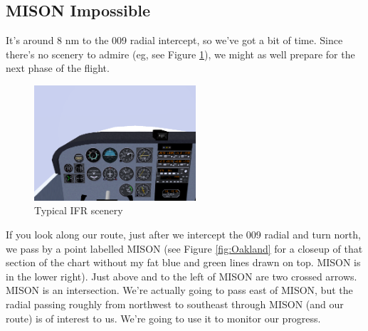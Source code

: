 \subsection{MISON Impossible}

It's around 8 nm to the 009 radial intercept, so we've got a bit of
time.  Since there's no scenery to admire (eg, see Figure
\ref{fig:murk}), we might as well prepare for the next phase of the
flight.

\begin{figure}
  \begin{center}
    \includegraphics[width=6cm]{img/murk}
    \caption{Typical IFR scenery}
    \label{fig:murk}
  \end{center}
\end{figure}

If you look along our route, just after we intercept the 009 radial
and turn north, we pass by a point labelled MISON (see Figure
\ref{fig:Oakland} for a closeup of that section of the chart without
my fat blue and green lines drawn on top.  MISON is in the lower
right).  Just above and to the left of MISON are two crossed arrows.
MISON is an intersection.  We're actually going to pass east of MISON,
but the radial passing roughly from northwest to southeast through
MISON (and our route) is of interest to us.  We're going to use it to
monitor our progress.

